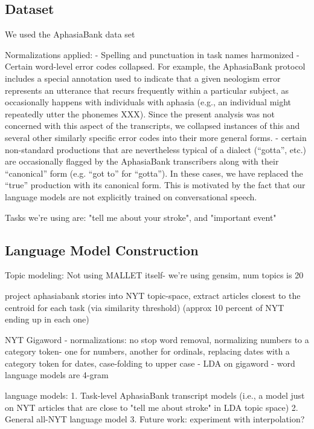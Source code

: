 \documentclass[11pt,letterpaper]{article}
\begin{document}
\subsection{Dataset} %
\label{sub:dataset}

We used the AphasiaBank data set \cite{MacWhinney:2011er}

Normalizations applied:
    - Spelling and punctuation in task names harmonized
    - Certain word-level error codes collapsed. For example, the AphasiaBank protocol includes a special annotation used to indicate that a given neologism error represents an utterance that recurs frequently within a particular subject, as occasionally happens with individuals with aphasia (e.g., an individual might repeatedly utter the phonemes XXX). Since the present analysis was not concerned with this aspect of the transcripts, we collapsed instances of this and several other similarly specific error codes into their more general forms.
    - certain non-standard productions that are nevertheless typical of a dialect (``gotta'', etc.) are occasionally flagged by the AphasiaBank transcribers along with their ``canonical'' form (e.g. ``got to'' for ``gotta''). In these cases, we have replaced the ``true'' production with its canonical form. This is motivated by the fact that our language models are not explicitly trained on conversational speech.

Tasks we're using are: "tell me about your stroke", and "important event"


\subsection{Language Model Construction} %
\label{sub:language_model_construction}

Topic modeling: Not using MALLET itself- we're using gensim, num topics is 20\cite{McCallumMALLET}

project aphasiabank stories into NYT topic-space, extract articles closest to the centroid for each task (via similarity threshold) (approx 10 percent of NYT ending up in each one)

NYT Gigaword
    - normalizations: no stop word removal, normalizing numbers to a category token- one for numbers, another for ordinals, replacing dates with a category token for dates, case-folding to upper case
    - LDA on gigaword
    - word language models are 4-gram

language models:
    1. Task-level AphasiaBank transcript models (i.e., a model just on NYT articles that are close to "tell me about stroke" in LDA topic space)
    2. General all-NYT language model
    3. Future work: experiment with interpolation?
    
\end{document}
